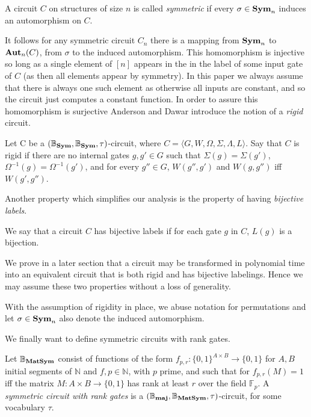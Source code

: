 \documentclass[../paper.tex]{subfiles}
\begin{document}
\begin{definition}
  A circuit $C$ on structures of size $n$ is called \emph{symmetric} if every
  $\sigma \in \text{\textbf{Sym}}_n$ induces an automorphism on $C$.
\end{definition}

It follows for any symmetric circuit $C_n$ there is a mapping from $\text{\textbf{Sym}}_n$ to
$\text{\textbf{Aut}}_n(C)$, from $ \sigma$ to the induced automorphism. This homomorphism is
injective so long as a single element of $[n]$ appears in the in the label of
some input gate of $C$ (as then all elements appear by
symmetry)\cite{AndersonD17}. In this paper we always assume that there is always
one such element as otherwise all inputs are constant, and so the circuit just
computes a constant function. In order to assure this homomorphism is surjective
Anderson and Dawar \cite{AndersonD17} introduce the notion of a \emph{rigid}
circuit.

\begin{definition}[Rigidity]
  Let C be a $(\mathbb{B}_{\text{\textbf{Sym}}}, \mathbb{B}_{\text{\textbf{Sym}}}, \tau)$-circuit, where $C =
  \langle G, W, \Omega, \Sigma, \Lambda, L\rangle$. Say that $C$ is rigid if
  there are no internal gates $g, g' \in G$ such that $\Sigma(g) = \Sigma (g')$,
  $\Omega^{-1}(g) = \Omega^{-1}(g')$, and for every $g'' \in G$, $W(g'', g')$
  and $W(g,g'')$ iff $W(g', g'')$.
\end{definition}

Another property which simplifies our analysis is the property of having
\emph{bijective labels}.

\begin{definition}
  We say that a circuit $C$ has bijective labels if for each gate $g$ in $C$,
  $L(g)$ is a bijection.
\end{definition}

We prove in a later section that a circuit may be transformed in polynomial time
into an equivalent circuit that is both rigid and has bijective labelings. Hence
we may assume these two properties without a loss of generality.

With the assumption of rigidity in place, we abuse notation for permutations and
let $\sigma \in \text{\textbf{Sym}}_n$ also denote the induced automorphism.

We finally want to define symmetric circuits with rank gates.

\begin{definition}
  Let $\mathbb{B}_{\text{\textbf{MatSym}}}$ consist of functions of the form $f_{p,r}:
  \{0,1\}^{A \times B} \rightarrow \{0,1\}$ for $A, B$ initial segments of
  $\mathbb{N}$ and $f, p \in \mathbb{N}$, with $p$ prime, and such that for
  $f_{p,r}(M) = 1$ iff the matrix $M: A \times B \rightarrow \{0,1\}$ has rank
  at least $r$ over the field $\mathbb{F}_p$. A \emph{symmetric circuit with
    rank gates} is a $(\mathbb{B}_{\text{\textbf{maj}}}, \mathbb{B}_{\text{\textbf{MatSym}}}, \tau)$-circuit, for some
  vocabulary $\tau$.
\end{definition}
\end{document}
